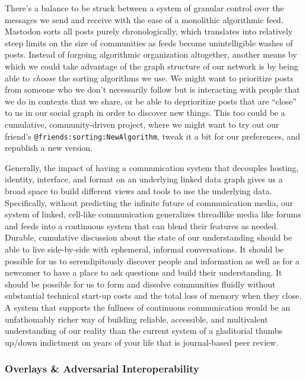 There's a balance to be struck between a system of granular control over
the messages we send and receive with the ease of a monolithic
algorithmic feed. Mastodon sorts all posts purely chronologically, which
translates into relatively steep limits on the size of communities as
feeds become unintelligible washes of posts. Instead of forgoing
algorithmic organization altogether, another means by which we could
take advantage of the graph structure of our network is by being able to
\emph{choose} the sorting algorithms we use. We might want to prioritize
posts from someone who we don't necessarily follow but is interacting
with people that we do in contexts that we share, or be able to
deprioritize posts that are ``close'' to us in our social graph in order
to discover new things. This too could be a cumulative, community-driven
project, where we might want to try out our friend's
\texttt{@friends:sorting:NewAlgorithm}, tweak it a bit for our
preferences, and republish a new version.

Generally, the impact of having a communication system that decouples
hosting, identity, interface, and format on an underlying linked data
graph gives us a broad space to build different views and tools to use
the underlying data. Specifically, without predicting the infinite
future of communication media, our system of linked, cell-like
communication generalizes threadlike media like forums and feeds into a
continuous system that can blend their features as needed. Durable,
cumulative discussion about the state of our understanding should be
able to live side-by-side with ephemeral, informal conversations. It
should be possible for us to serendipitously discover people and
information as well as for a newcomer to have a place to ask questions
and build their understanding. It should be possible for us to form and
dissolve communities fluidly without substantial technical start-up
costs and the total loss of memory when they close. A system that
supports the fullness of continuous communication would be an
unfathomably richer way of building reliable, accessible, and
multivalent understanding of our reality than the current system of a
gladitorial thumbs up/down indictment on years of your life that is
journal-based peer review.

\hypertarget{overlays-adversarial-interoperability}{%
\subsubsection{Overlays \& Adversarial
Interoperability}\label{overlays-adversarial-interoperability}}

